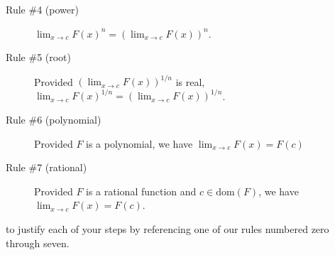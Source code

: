 \documentclass[12pt, answers,fleqn]{exam}
\newcommand{\dom}{\mbox{dom}}
\begin{document}
\begin{questions}
\begin{description}
    \item [Rule \#4 (power)]  $ \displaystyle \lim_{x \to c} F(x)^n  = \left(\lim_{x \to c} F(x) \right)^n  $.
    
    \item [Rule \#5 (root)]  Provided $ \displaystyle  \left(\lim_{x \to c} F(x) \right)^{1/n} $ is real,  $ \displaystyle \lim_{x \to c} F(x)^{1/n}  = \left(\lim_{x \to c} F(x) \right)^{1/n}  $.
    
    \item [Rule \#6 (polynomial)]  Provided $F$ is a polynomial, we have  $ \displaystyle \lim_{x \to c} F(x) = F(c)$
    
     \item [Rule \#7 (rational)]  Provided $F$ is a rational function and $c \in \dom(F)$, we have  \mbox{$ \displaystyle \lim_{x \to c} F(x) = F(c)$.}
    \end{description}

    to justify each of your 
    steps by referencing one of our rules numbered zero through seven.
    
\end{questions}
\end{document}
